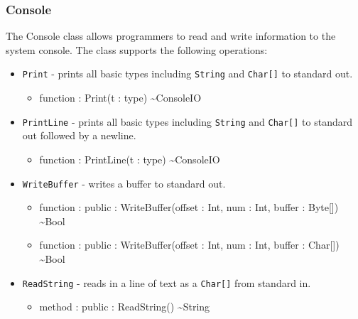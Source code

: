 \documentclass[11pt]{article}
\begin{document}
\subsubsection{Console}
The Console class allows programmers to read and write information to
the system console.  The class supports the following operations:
\begin{itemize}
\item \texttt{Print} - prints all basic types including
  \texttt{String} and \texttt{Char[]} to standard out.
  \begin{itemize}
  \item function : Print(t : type) \textasciitilde ConsoleIO
  \end{itemize}
\item \texttt{PrintLine} - prints all basic types including
  \texttt{String} and \texttt{Char[]} to standard out followed by a
  newline.
  \begin{itemize}
  \item function : PrintLine(t : type) \textasciitilde ConsoleIO
  \end{itemize}
\item \texttt{WriteBuffer} - writes a buffer to standard out.
  \begin{itemize}
  \item function : public : WriteBuffer(offset : Int, num : Int, buffer : Byte[]) \textasciitilde Bool
  \item function : public : WriteBuffer(offset : Int, num : Int, buffer : Char[]) \textasciitilde Bool
  \end{itemize}
\item \texttt{ReadString} - reads in a line of text as a
  \texttt{Char[]} from standard in.
  \begin{itemize}
  \item method : public : ReadString() \textasciitilde String
  \end{itemize}
\end{itemize}
\end{document}
